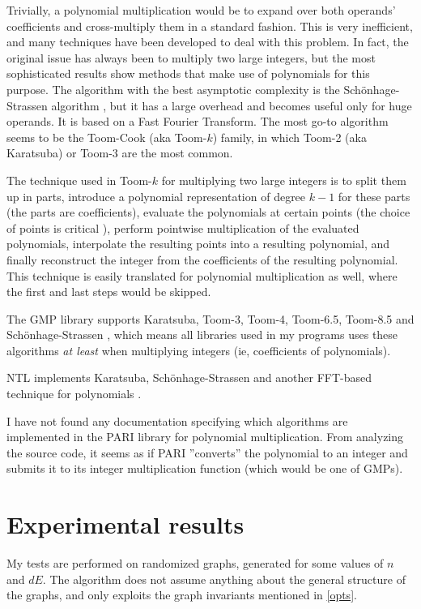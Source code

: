 \documentclass[a4paper]{article}
\begin{document}
Trivially, a polynomial multiplication would be to expand over both operands' coefficients and cross-multiply them in a standard fashion. This is very inefficient, and many techniques have been developed to deal with this problem. In fact, the original issue has always been to multiply two large integers, but the most sophisticated results show methods that make use of polynomials for this purpose. The algorithm with the best asymptotic complexity is the Schönhage-Strassen algorithm \cite{strass}, but it has a large overhead and becomes useful only for huge operands. It is based on a Fast Fourier Transform. The most go-to algorithm seems to be the Toom-Cook \cite{toom-cook} (aka Toom-$k$) family, in which Toom-2 (aka Karatsuba) or Toom-3 are the most common.

The technique used in Toom-$k$ for multiplying two large integers is to split them up in parts, introduce a polynomial representation of degree $k-1$ for these parts (the parts are coefficients), evaluate the polynomials at certain points (the choice of points is critical%
), perform pointwise multiplication of the evaluated polynomials, interpolate the resulting points into a resulting polynomial, and finally reconstruct the integer from the coefficients of the resulting polynomial. This technique is easily translated for polynomial multiplication as well, where the first and last steps would be skipped.

The GMP library supports Karatsuba, Toom-3, Toom-4, Toom-6.5, Toom-8.5 and Schönhage-Strassen \cite[p 90]{gmp}, which means all libraries used in my programs uses these algorithms \emph{at least} when multiplying integers (ie, coefficients of polynomials).

NTL implements Karatsuba, Schönhage-Strassen and another FFT-based technique for polynomials \cite{ntl_zzx}.

I have not found any documentation specifying which algorithms are implemented in the PARI library for polynomial multiplication. From analyzing the source code, it seems as if PARI ''converts'' the polynomial to an integer and submits it to its integer multiplication function (which would be one of GMPs).

\section{Experimental results}
My tests are performed on randomized graphs, generated for some values of $n$ and $dE$. The algorithm does not assume anything about the general structure of the graphs, and only exploits the graph invariants mentioned in \ref{opts}.
\end{document}
